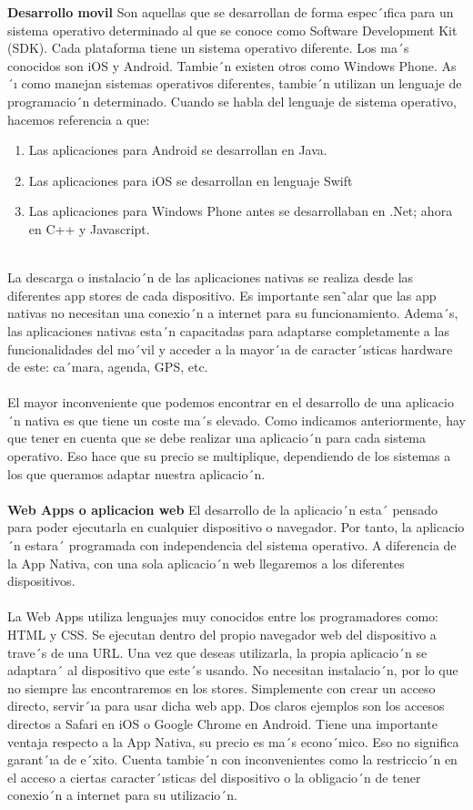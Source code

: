 \documentclass[conference,compsoc,onecolumn]{IEEEtran}
\begin{document}
\textbf{Desarrollo movil} Son aquellas que se desarrollan de forma espec´ıfica para un sistema operativo determinado al que se conoce como Software Development Kit (SDK). Cada plataforma tiene un sistema operativo diferente. Los ma´s conocidos son iOS y Android. Tambie´n existen otros como Windows Phone. As´ı como manejan sistemas operativos diferentes,  tambie´n  utilizan  un  lenguaje  de  programacio´n  determinado.  Cuando  se  habla  del  lenguaje  de  sistema operativo, hacemos referencia a que:
\begin{enumerate}
    
    \item Las aplicaciones para Android se desarrollan en Java.
    \item Las aplicaciones para iOS se desarrollan en lenguaje Swift
    \item Las aplicaciones para Windows Phone antes se desarrollaban en .Net; ahora en C++ y Javascript.\\ \\

\end{enumerate}
La descarga o instalacio´n de las aplicaciones nativas se realiza desde las diferentes app stores de cada dispositivo. Es  importante  sen˜alar  que  las  app  nativas  no  necesitan  una  conexio´n  a  internet  para  su  funcionamiento.  Adema´s, las aplicaciones nativas esta´n capacitadas para adaptarse completamente a las funcionalidades del mo´vil y acceder a la mayor´ıa de caracter´ısticas hardware de este: ca´mara, agenda, GPS, etc.
\\
\\
El mayor inconveniente que podemos encontrar en el desarrollo de una aplicacio´n nativa es que tiene un coste ma´s elevado.  Como  indicamos  anteriormente,  hay  que  tener  en  cuenta  que  se  debe  realizar  una  aplicacio´n  para  cada sistema operativo. Eso hace que su precio se multiplique, dependiendo de los sistemas a los que queramos adaptar nuestra aplicacio´n.
\\
\\
\textbf{Web Apps o aplicacion web } El desarrollo de la aplicacio´n esta´ pensado para poder ejecutarla en cualquier dispositivo o  navegador.  Por  tanto,  la  aplicacio´n  estara´  programada  con  independencia  del  sistema  operativo.  A  diferencia  de la App Nativa, con una sola aplicacio´n web llegaremos a los diferentes dispositivos.
\\
\\
La Web Apps utiliza lenguajes muy conocidos entre los programadores como: HTML y CSS. Se ejecutan dentro del propio navegador web del dispositivo a trave´s de una URL. Una vez que deseas utilizarla, la propia aplicacio´n se adaptara´  al dispositivo que este´s usando. No necesitan instalacio´n, por lo que no siempre las encontraremos en los stores. Simplemente con crear un acceso directo, servir´ıa para usar dicha web app. Dos claros ejemplos son los accesos directos a Safari en iOS o Google Chrome en Android. Tiene una importante ventaja respecto a la App Nativa, su precio es ma´s econo´mico. Eso no significa garant´ıa de e´xito. Cuenta tambie´n con inconvenientes como la restriccio´n en el acceso a ciertas caracter´ısticas del dispositivo o la obligacio´n de tener conexio´n a internet para su utilizacio´n.
\end{document}
